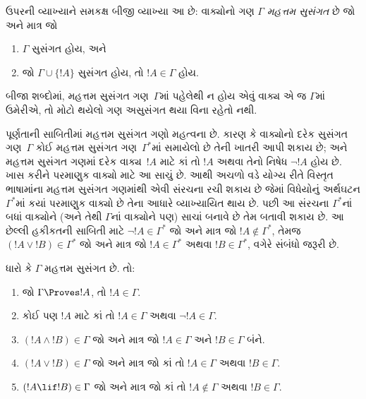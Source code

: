 \begin{explain}
ઉપરની વ્યાખ્યાને સમકક્ષ
બીજી વ્યાખ્યા આ છે:
વાક્યોનો ગણ $\Gamma$
\emph{મહત્તમ સુસંગત} છે
જો અને માત્ર જો
\begin{enumerate}
\item $\Gamma$ સુસંગત હોય, અને
\item જો $\Gamma \cup \{ !A \}$ સુસંગત હોય,
તો $!A \in \Gamma$ હોય.
\end{enumerate}
બીજા શબ્દોમાં, મહત્તમ સુસંગત
ગણ~$\Gamma$માં પહેલેથી ન
હોય એવું વાક્ય એ જ $\Gamma$માં ઉમેરીએ,
તો મોટો થયેલો ગણ
અસુસંગત થયા વિના રહેતો નથી.
\end{explain}

\begin{explain}
પૂર્ણતાની સાબિતીમાં મહત્તમ સુસંગત
ગણો મહત્વના છે. કારણ કે
વાક્યોનો દરેક સુસંગત
ગણ~$\Gamma$ કોઈ મહત્તમ
સુસંગત ગણ~$\Gamma^*$માં
સમાયેલો છે તેની ખાતરી
આપી શકાય છે; અને
મહત્તમ સુસંગત ગણમાં
દરેક વાક્ય~$!A$
માટે કાં તો $!A$ અથવા
તેનો નિષેધ $\lnot !A$
હોય છે. ખાસ કરીને
પરમાણુક વાક્યો
માટે આ સાચું છે.
આથી અચળો વડે
યોગ્ય રીતે વિસ્તૃત
ભાષામાંના મહત્તમ
સુસંગત ગણમાંથી
એવી સંરચના
રચી શકાય છે જેમાં
વિધેયોનું અર્થઘટન
$\Gamma^*$માં કયાં
પરમાણુક વાક્યો
છે તેના આધારે
વ્યાખ્યાયિત થાય છે.
પછી આ સંરચના
$\Gamma^*$નાં બધાં
વાક્યોને
(અને તેથી $\Gamma$નાં
વાક્યોને પણ) સાચાં
બનાવે છે તેમ બતાવી
શકાય છે. આ છેલ્લી
હકીકતની સાબિતી માટે
$\lnot !A \in
\Gamma^*$ જો અને માત્ર જો
$!A \notin \Gamma^*$,
તેમજ $(!A \lor !B) \in \Gamma^*$
જો અને માત્ર જો
$!A \in \Gamma^*$ અથવા
$!B \in \Gamma^*$,
વગેરે સંબંધો જરૂરી છે.
\end{explain}

\begin{prop}
ધારો કે $\Gamma$ મહત્તમ સુસંગત છે. તો:
\begin{enumerate}
\item {} જો $\Gamma \Proves !A$, તો $!A \in
  \Gamma$.

\item {} કોઈ પણ $!A$ માટે
  કાં તો $!A \in \Gamma$ અથવા $\lnot !A \in \Gamma$.

\item {} $(!A \land !B) \in \Gamma$
  જો અને માત્ર જો $!A \in \Gamma$ અને $!B \in \Gamma$ બંને.

\item {} $(!A \lor !B) \in \Gamma$
  જો અને માત્ર જો કાં તો $!A \in \Gamma$ અથવા $!B \in \Gamma$.

\item {} $(!A \lif !B) \in \Gamma$
  જો અને માત્ર જો કાં તો $!A \notin \Gamma$ અથવા $!B \in \Gamma$.
\end{enumerate}
\end{prop}

